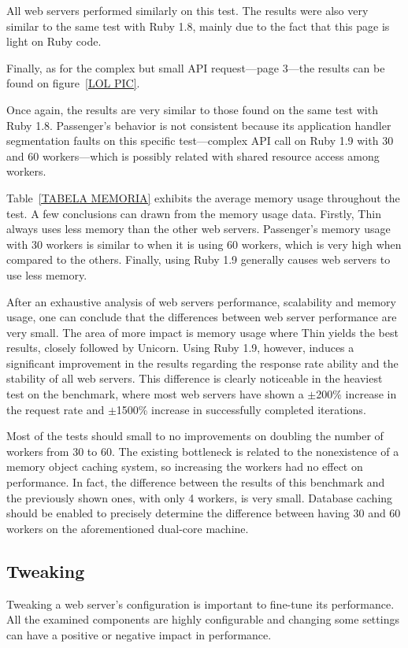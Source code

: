 All web servers performed similarly on this test. The results were also very similar to the same test with Ruby 1.8, mainly due to the fact that this page is light on Ruby code.

Finally, as for the complex but small API request---page 3---the results can be found on figure~\ref{LOL PIC}.

Once again, the results are very similar to those found on the same test with Ruby 1.8. Passenger's behavior is not consistent because its application handler segmentation faults on this specific test---complex API call on Ruby 1.9 with 30 and 60 workers---which is possibly related with shared resource access among workers.

Table~\ref{TABELA MEMORIA} exhibits the average memory usage throughout the test. A few conclusions can drawn from the memory usage data. Firstly, Thin always uses less memory than the other web servers. Passenger's memory usage with 30 workers is similar to when it is using 60 workers, which is very high when compared to the others. Finally, using Ruby 1.9 generally causes web servers to use less memory.

After an exhaustive analysis of web servers performance, scalability and memory usage, one can conclude that the differences between web server performance are very small. The area of more impact is memory usage where Thin yields the best results, closely followed by Unicorn. Using Ruby 1.9, however, induces a significant improvement in the results regarding the response rate ability and the stability of all web servers. This difference is clearly noticeable in the heaviest test on the benchmark, where most web servers have shown a $\pm$200\% increase in the request rate and $\pm$1500\% increase in successfully completed iterations.

Most of the tests should small to no improvements on doubling the number of workers from 30 to 60. The existing bottleneck is related to the nonexistence of a memory object caching system, so increasing the workers had no effect on performance. In fact, the difference between the results of this benchmark and the previously shown ones, with only 4 workers, is very small. Database caching should be enabled to precisely determine the difference between having 30 and 60 workers on the aforementioned dual-core machine.

\subsection{Tweaking}
Tweaking a web server's configuration is important to fine-tune its performance. All the examined components are highly configurable and changing some settings can have a positive or negative impact in performance.

